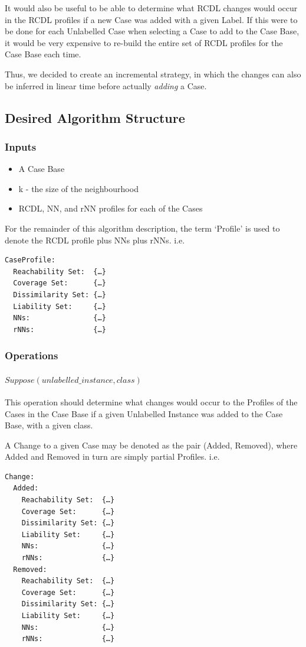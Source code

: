 \documentclass[a4paper,11pt]{report}
\begin{document}
It would also be useful to be able to determine what RCDL changes would occur in the RCDL profiles if a new Case was added with a given Label. If this were to be done for each Unlabelled Case when selecting a Case to add to the Case Base, it would be very expensive to re-build the entire set of RCDL profiles for the Case Base each time.

Thus, we decided to create an incremental strategy, in which the changes can also be inferred in linear time before actually \emph{adding} a Case.

\subsection{Desired Algorithm Structure}
\subsubsection{Inputs}
\begin{itemize}
	\item A Case Base 
	\item k - the size of the neighbourhood
	\item RCDL, NN, and rNN profiles for each of the Cases
\end{itemize}

For the remainder of this algorithm description, the term `Profile' is used to denote the RCDL profile plus NNs plus rNNs. i.e. 
\begin{verbatim}
CaseProfile:  
  Reachability Set:  {…}
  Coverage Set:      {…}
  Dissimilarity Set: {…}
  Liability Set:     {…}
  NNs:               {…}
  rNNs:              {…}
\end{verbatim}

\subsubsection{Operations}
\paragraph{$Suppose(unlabelled\_instance, class)$}
This operation should determine what changes would occur to the Profiles of the Cases in the Case Base if a given Unlabelled Instance was added to the Case Base, with a given class.

A Change to a given Case may be denoted as the pair (Added, Removed), where Added and Removed in turn are simply partial Profiles. i.e.
\begin{verbatim}
Change:
  Added:
    Reachability Set:  {…}
    Coverage Set:      {…}
    Dissimilarity Set: {…}
    Liability Set:     {…}
    NNs:               {…}
    rNNs:              {…}
  Removed:
    Reachability Set:  {…}
    Coverage Set:      {…}
    Dissimilarity Set: {…}
    Liability Set:     {…}
    NNs:               {…}
    rNNs:              {…}
\end{verbatim}
\end{document}
